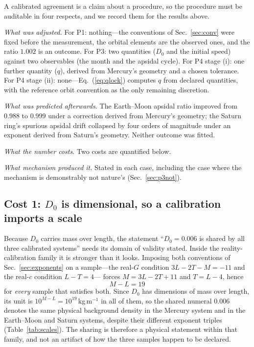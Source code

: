 \documentclass[aps,reprint,amsmath,amssymb,nofootinbib,superscriptaddress,floatfix]{revtex4-2}
\begin{document}
A calibrated agreement is a claim about a procedure, so the procedure
must be auditable in four respects, and we record them for the results
above.

\emph{What was adjusted.}
For P1: nothing---the conventions of Sec.~\ref{sec:conv} were fixed
before the measurement, the orbital elements are the observed ones, and
the ratio $1.002$ is an outcome.
For P3: two quantities ($D_0$ and the initial speed) against two
observables (the month and the apsidal cycle).
For P4 stage (i): one further quantity ($q$), derived from Mercury's
geometry and a chosen tolerance.
For P4 stage (ii): none---Eq.~(\ref{eq:qlock}) computes $q$ from
declared quantities, with the reference orbit convention as the only
remaining discretion.

\emph{What was predicted afterwards.}
The Earth--Moon apsidal ratio improved from $0.988$ to $0.999$ under a
correction derived from Mercury's geometry; the Saturn ring's spurious
apsidal drift collapsed by four orders of magnitude under an exponent
derived from Saturn's geometry.
Neither outcome was fitted.

\emph{What the number costs.}
Two costs are quantified below.

\emph{What mechanism produced it.}
Stated in each case, including the case where the mechanism is
demonstrably not nature's (Sec.~\ref{sec:p3not}).

\subsection{Cost 1: \texorpdfstring{$D_0$}{D0} is dimensional, so a
  calibration imports a scale}
\label{sec:cost1}

Because $D_0$ carries mass over length, the statement ``$D_0=0.006$ is
shared by all three calibrated systems'' needs its domain of validity
stated.
Inside the reality-calibration family it is stronger than it looks.
Imposing both conventions of Sec.~\ref{sec:exponents} on a sample---the
real-$G$ condition $3L-2T-M=-11$ and the real-$c$ condition $L-T=4$---
forces $M=3L-2T+11$ and $T=L-4$, hence
\begin{equation}
  M-L = 19
  \label{eq:ML}
\end{equation}
for \emph{every} sample that satisfies both.
Since $D_0$ has dimensions of mass over length, its unit is
$10^{M-L}=10^{19}$\,kg\,m$^{-1}$ in all of them, so the shared numeral
$0.006$ denotes the same physical background density in the Mercury
system and in the Earth--Moon and Saturn systems, despite their
different exponent triples (Table~\ref{tab:scales}).
The sharing is therefore a physical statement within that family, and
not an artifact of how the three samples happen to be declared.
\end{document}
